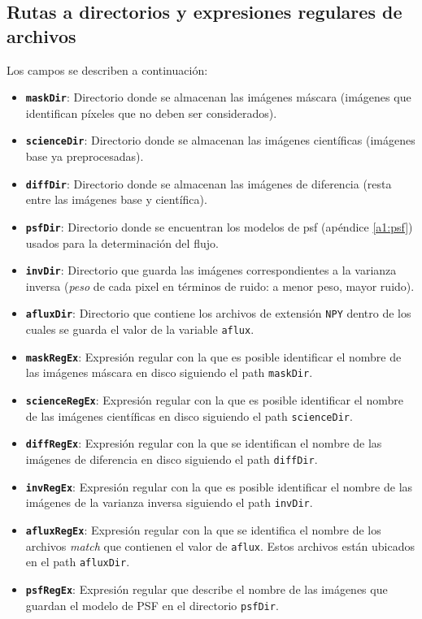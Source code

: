 \begin{appendix}
\subsection{Rutas a directorios y expresiones regulares de archivos}
\label{subs:des_rutas}
Los campos se describen a continuaci\'on:
\begin{itemize}
\item \textbf{\texttt{maskDir}}: Directorio donde se almacenan las im\'agenes m\'ascara (im\'agenes que identifican p\'ixeles que no deben ser considerados).
\item \textbf{\texttt{scienceDir}}: Directorio donde se almacenan las im\'agenes cient\'ificas (im\'agenes base ya preprocesadas).
\item \textbf{\texttt{diffDir}}: Directorio donde se almacenan las im\'agenes de diferencia (resta entre las im\'agenes base y cient\'ifica).
\item \textbf{\texttt{psfDir}}: Directorio donde se encuentran los modelos de psf (ap\'endice \ref{a1:psf}) usados para la determinaci\'on del flujo.
\item \textbf{\texttt{invDir}}: Directorio que guarda las im\'agenes correspondientes a la varianza inversa (\textit{peso} de cada pixel en t\'erminos de ruido: a menor peso, mayor ruido).
\item \textbf{\texttt{afluxDir}}: Directorio que contiene los archivos de extensi\'on \texttt{NPY} dentro de los cuales se guarda el valor de la variable \texttt{aflux}.
\item \textbf{\texttt{maskRegEx}}: Expresi\'on regular con la que es posible identificar el nombre de las im\'agenes m\'ascara en disco siguiendo el path \texttt{maskDir}.
\item \textbf{\texttt{scienceRegEx}}: Expresi\'on regular con la que es posible identificar el nombre de las im\'agenes cient\'ificas en disco siguiendo el path \texttt{scienceDir}.
\item \textbf{\texttt{diffRegEx}}: Expresi\'on regular con la que se identifican el nombre de las im\'agenes de diferencia en disco siguiendo el path \texttt{diffDir}.
\item \textbf{\texttt{invRegEx}}: Expresi\'on regular con la que es posible identificar el nombre de las im\'agenes de la varianza inversa siguiendo el path \texttt{invDir}.
\item \textbf{\texttt{afluxRegEx}}: Expresi\'on regular con la que se identifica el nombre de los archivos \textit{match} que contienen el valor de \texttt{aflux}. Estos archivos est\'an ubicados en el path \texttt{afluxDir}.
\item \textbf{\texttt{psfRegEx}}: Expresi\'on regular que describe el nombre de las im\'agenes que guardan el modelo de PSF en el directorio \texttt{psfDir}.
\end{itemize}


\end{appendix}
